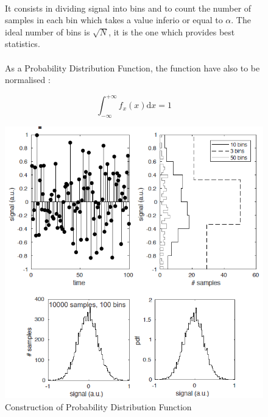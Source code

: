 \begin{figure}[h]
\begin{minipage}{0.5\textwidth}
   \paragraph{}
    It consists in dividing signal into bins and to count the number of samples in each bin which takes a value inferio or equal to \(\alpha\). The ideal number of bins is \(\sqrt{N}\), it is the one which provides best statistics. 

\paragraph{}
As a Probability Distribution Function, the function have also to be normalised : 

\begin{equation*}
    \int_{-\infty} ^{+\infty} f_x (x) \textrm{d}x = 1 
\end{equation*}
\end{minipage}
\begin{minipage}{0.5\textwidth}
    \centering
    \includegraphics[scale=0.4]{Figures Cours Traitement du Signal/PDF in practice from discrete data.png}
    \caption{Construction of Probability Distribution Function}
    \label{fig:PDF}
\end{minipage}
\end{figure}


